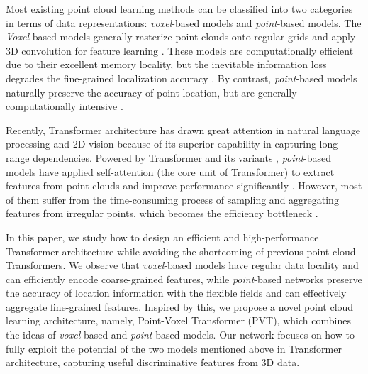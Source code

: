 \documentclass[10pt,twocolumn,letterpaper]{article}
\begin{document}
Most existing point cloud learning methods can be classified into two categories in terms of data representations: \emph{voxel}-based models and \emph{point}-based models. The \emph{Voxel}-based models generally rasterize point clouds onto regular grids and apply 3D convolution for feature learning \cite{zhou2018voxelnet,2016Volumetric,2019VoxSegNet}. These models are computationally efficient due to their excellent memory locality, but the inevitable information loss degrades the fine-grained localization accuracy \cite{2019PV}. By contrast, \emph{point}-based models naturally preserve the accuracy of point location, but are generally computationally intensive
\cite{Spectral,2020ClusterNet,2019Modeling}.

Recently, Transformer architecture has drawn great attention in natural
language processing and 2D vision because of its superior capability in capturing long-range dependencies.
Powered by Transformer \cite{2017Attention} and its variants \cite{liu2021swin,DBLP:journals/corr/abs-2010-11929}, \emph{point}-based models have applied self-attention (the core unit of Transformer) to extract features from point clouds and improve performance significantly \cite{guo2020pct,Nico,zhao2020point,2020PointASNL}. However, most of them suffer from the time-consuming process of sampling and aggregating features from irregular points, which becomes the efficiency bottleneck \cite{2019Point}.

In this paper, we study how to design an efficient and high-performance Transformer architecture while avoiding the shortcoming of previous point cloud Transformers. We observe that \emph{voxel}-based models have regular data locality and can efficiently encode coarse-grained features, while \emph{point}-based networks preserve the accuracy of location information with the flexible fields and can effectively aggregate fine-grained features. Inspired by this, we propose a novel point cloud learning architecture, namely, Point-Voxel Transformer (PVT), which combines the ideas of \emph{voxel}-based and \emph{point}-based models. Our network focuses on how to fully exploit the potential of the two models mentioned above in Transformer architecture, capturing useful discriminative features from 3D data.
\end{document}
